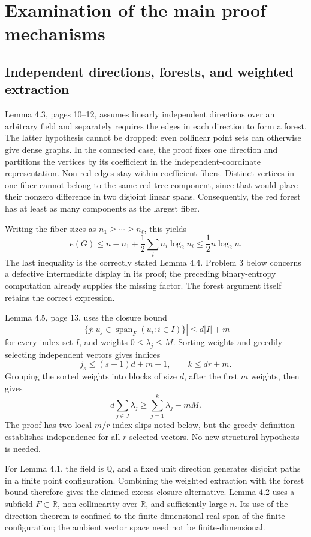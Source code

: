 \documentclass[10pt]{article}
\begin{document}
\section*{Examination of the main proof mechanisms}
\subsection*{Independent directions, forests, and weighted extraction}
Lemma 4.3, pages 10–12, assumes linearly independent directions over an arbitrary field and separately requires the edges in each direction to form a forest. The latter hypothesis cannot be dropped: even collinear point sets can otherwise give dense graphs. In the connected case, the proof fixes one direction and partitions the vertices by its coefficient in the independent-coordinate representation. Non-red edges stay within coefficient fibers. Distinct vertices in one fiber cannot belong to the same red-tree component, since that would place their nonzero difference in two disjoint linear spans. Consequently, the red forest has at least as many components as the largest fiber.\par
Writing the fiber sizes as \(n_1\ge\cdots\ge n_\ell\), this yields \[e(G)\le n-n_1+\frac12\sum_i n_i\log_2 n_i
       \le \frac12 n\log_2 n.\] The last inequality is the correctly stated Lemma 4.4. Problem 3 below concerns a defective intermediate display in its proof; the preceding binary-entropy computation already supplies the missing factor. The forest argument itself retains the correct expression.\par
Lemma 4.5, page 13, uses the closure bound \[|\{j:u_j\in\operatorname{span}_F(u_i:i\in I)\}|\le d|I|+m\] for every index set \(I\), and weights \(0\le\lambda_j\le M\). Sorting weights and greedily selecting independent vectors gives indices \[j_s\le (s-1)d+m+1,\qquad k\le dr+m.\] Grouping the sorted weights into blocks of size \(d\), after the first \(m\) weights, then gives \[d\sum_{j\in J}\lambda_j\ge\sum_{j=1}^k\lambda_j-mM.\] The proof has two local \(m/r\) index slips noted below, but the greedy definition establishes independence for all \(r\) selected vectors. No new structural hypothesis is needed.\par
For Lemma 4.1, the field is \(\mathbb Q\), and a fixed unit direction generates disjoint paths in a finite point configuration. Combining the weighted extraction with the forest bound therefore gives the claimed excess-closure alternative. Lemma 4.2 uses a subfield \(F\subset\mathbb R\), non-collinearity over \(\mathbb R\), and sufficiently large \(n\). Its use of the direction theorem is confined to the finite-dimensional real span of the finite configuration; the ambient vector space need not be finite-dimensional.\par
\end{document}
